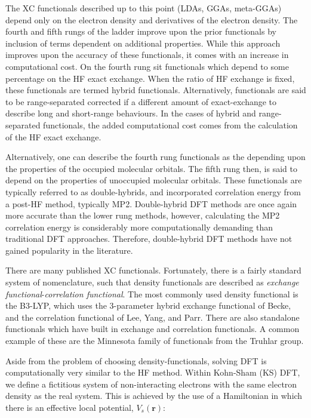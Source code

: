 The XC functionals described up to this point (LDAs, GGAs, meta-GGAs) depend
only on the electron density and derivatives of the electron density. The
fourth and fifth rungs of the ladder improve upon the prior functionals by
inclusion of terms dependent on additional properties. While this approach
improves upon the accuracy of these functionals, it comes with an increase in
computational cost. On the fourth rung sit functionals which depend to some
percentage on the HF exact exchange. When the ratio of HF exchange is fixed,
these functionals are termed hybrid functionals. Alternatively, functionals are
said to be range-separated corrected if a different amount of exact-exchange to
describe long and short-range behaviours. In the cases of hybrid and
range-separated functionals, the added computational cost comes from the
calculation of the HF exact exchange.

Alternatively, one can describe the fourth rung functionals as the depending
upon the properties of the occupied molecular orbitals. The fifth rung then, is
said to depend on the properties of unoccupied molecular orbitals. These
functionals are typically referred to as double-hybrids, and incorporated
correlation energy from a post-HF method, typically MP2.\cite{Goerigk2014}
Double-hybrid DFT methods are once again more accurate than the lower rung
methods, however, calculating the MP2 correlation energy is considerably more
computationally demanding than traditional DFT approaches. Therefore,
double-hybrid DFT methods have not gained popularity in the literature.

There are many published XC functionals. Fortunately, there is a fairly
standard system of nomenclature, such that density functionals are described as
\emph{exchange functional}-\emph{correlation functional}. The most commonly
used density functional is the  B3-LYP, which uses the 3-parameter hybrid
exchange functional of Becke,\cite{Becke1993} and the correlation functional of
Lee, Yang, and Parr.\cite{Lee1988} There are also standalone functionals which
have built in exchange and correlation functionals. A common example of these
are the Minnesota family of functionals from the Truhlar
group.\cite{Zhao2006,Zhao2006a}

Aside from the problem of choosing density-functionals, solving DFT is
computationally very similar to the HF method. Within Kohn-Sham (KS) DFT, we
define a fictitious system of non-interacting electrons with the same electron
density as the real system. This is achieved by the use of a Hamiltonian in
which there is an effective local potential, $V_s(\mathbf{r})$:

